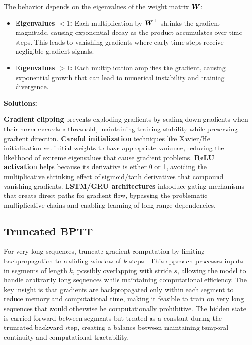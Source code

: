 The behavior depends on the eigenvalues of the weight matrix $\boldsymbol{W}$:
\begin{itemize}
    \item \textbf{Eigenvalues $< 1$:} Each multiplication by $\boldsymbol{W}^\top$ shrinks the gradient magnitude, causing exponential decay as the product accumulates over time steps. This leads to vanishing gradients where early time steps receive negligible gradient signals.
    \item \textbf{Eigenvalues $> 1$:} Each multiplication amplifies the gradient, causing exponential growth that can lead to numerical instability and training divergence.
\end{itemize}

\textbf{Solutions:}

\textbf{Gradient clipping} prevents exploding gradients by scaling down gradients when their norm exceeds a threshold, maintaining training stability while preserving gradient direction. \textbf{Careful initialization} techniques like Xavier/He initialization set initial weights to have appropriate variance, reducing the likelihood of extreme eigenvalues that cause gradient problems. \textbf{ReLU activation} helps because its derivative is either 0 or 1, avoiding the multiplicative shrinking effect of sigmoid/tanh derivatives that compound vanishing gradients. \textbf{LSTM/GRU architectures} introduce gating mechanisms that create direct paths for gradient flow, bypassing the problematic multiplicative chains and enabling learning of long-range dependencies.

\subsection{Truncated BPTT}

For very long sequences, truncate gradient computation by limiting backpropagation to a sliding window of $k$ steps \cite{GoodfellowEtAl2016}. This approach processes inputs in segments of length $k$, possibly overlapping with stride $s$, allowing the model to handle arbitrarily long sequences while maintaining computational efficiency. The key insight is that gradients are backpropagated only within each segment to reduce memory and computational time, making it feasible to train on very long sequences that would otherwise be computationally prohibitive. The hidden state is carried forward between segments but treated as a constant during the truncated backward step, creating a balance between maintaining temporal continuity and computational tractability.

